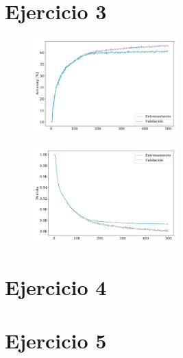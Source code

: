 \section*{Ejercicio 3}

\begin{figure}
    \begin{small}
        \begin{center}
            \includegraphics[width=0.5\textwidth]{Graphs/ejer3_acc.pdf}
        \end{center}
        \caption{}
        \label{fig:}
    \end{small}
\end{figure}


\begin{figure}
    \begin{small}
        \begin{center}
            \includegraphics[width=0.5\textwidth]{Graphs/ejer3_loss.pdf}
        \end{center}
        \caption{}
        \label{fig:}
    \end{small}
\end{figure}



\section*{Ejercicio 4}

\section*{Ejercicio 5}

